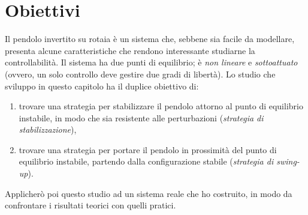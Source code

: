 \section{Obiettivi}
Il pendolo invertito su rotaia è un sistema che,
sebbene sia facile da modellare, presenta alcune
caratteristiche che rendono interessante studiarne la
controllabilità.
Il sistema ha due punti di equilibrio; è
\emph{non lineare} e \emph{sottoattuato} (ovvero, un solo controllo
deve gestire due gradi di libertà).
Lo studio che sviluppo in questo capitolo ha il duplice obiettivo di:
\begin{enumerate}
    \item trovare una strategia per stabilizzare il pendolo attorno al punto di equilibrio instabile, in modo che sia resistente alle perturbazioni (\emph{strategia di stabilizzazione}),
    \item trovare una strategia per portare il pendolo in prossimità del punto di equilibrio instabile, partendo dalla configurazione stabile (\emph{strategia di swing-up}).
\end{enumerate}
Applicherò poi questo studio ad un sistema reale che ho costruito, 
in modo da confrontare i risultati teorici con quelli pratici.